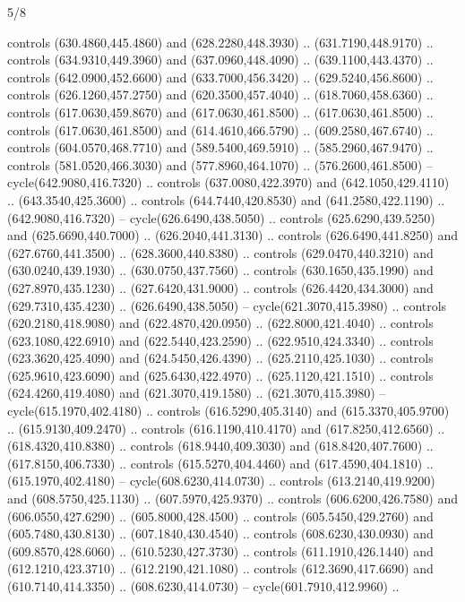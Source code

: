\begin{flagdescription}{5/8}
\begin{scope}[shift={(m)}]
\begin{scope}[scale=\flagwidth/220,y=0.1mm, x=0.1mm, yscale=-1,shift={(-596,-360)}]
\begin{scope}[line width=0.381\lw]
\begin{scope}[draw=black]
  controls (630.4860,445.4860) and (628.2280,448.3930) .. (631.7190,448.9170) ..
  controls (634.9310,449.3960) and (637.0960,448.4090) .. (639.1100,443.4370) ..
  controls (642.0900,452.6600) and (633.7000,456.3420) .. (629.5240,456.8600) ..
  controls (626.1260,457.2750) and (620.3500,457.4040) .. (618.7060,458.6360) ..
  controls (617.0630,459.8670) and (617.0630,461.8500) .. (617.0630,461.8500) ..
  controls (617.0630,461.8500) and (614.4610,466.5790) .. (609.2580,467.6740) ..
  controls (604.0570,468.7710) and (589.5400,469.5910) .. (585.2960,467.9470) ..
  controls (581.0520,466.3030) and (577.8960,464.1070) .. (576.2600,461.8500) --
  cycle(642.9080,416.7320) .. controls (637.0080,422.3970) and
  (642.1050,429.4110) .. (643.3540,425.3600) .. controls (644.7440,420.8530) and
  (641.2580,422.1190) .. (642.9080,416.7320) -- cycle(626.6490,438.5050) ..
  controls (625.6290,439.5250) and (625.6690,440.7000) .. (626.2040,441.3130) ..
  controls (626.6490,441.8250) and (627.6760,441.3500) .. (628.3600,440.8380) ..
  controls (629.0470,440.3210) and (630.0240,439.1930) .. (630.0750,437.7560) ..
  controls (630.1650,435.1990) and (627.8970,435.1230) .. (627.6420,431.9000) ..
  controls (626.4420,434.3000) and (629.7310,435.4230) .. (626.6490,438.5050) --
  cycle(621.3070,415.3980) .. controls (620.2180,418.9080) and
  (622.4870,420.0950) .. (622.8000,421.4040) .. controls (623.1080,422.6910) and
  (622.5440,423.2590) .. (622.9510,424.3340) .. controls (623.3620,425.4090) and
  (624.5450,426.4390) .. (625.2110,425.1030) .. controls (625.9610,423.6090) and
  (625.6430,422.4970) .. (625.1120,421.1510) .. controls (624.4260,419.4080) and
  (621.3070,419.1580) .. (621.3070,415.3980) -- cycle(615.1970,402.4180) ..
  controls (616.5290,405.3140) and (615.3370,405.9700) .. (615.9130,409.2470) ..
  controls (616.1190,410.4170) and (617.8250,412.6560) .. (618.4320,410.8380) ..
  controls (618.9440,409.3030) and (618.8420,407.7600) .. (617.8150,406.7330) ..
  controls (615.5270,404.4460) and (617.4590,404.1810) .. (615.1970,402.4180) --
  cycle(608.6230,414.0730) .. controls (613.2140,419.9200) and
  (608.5750,425.1130) .. (607.5970,425.9370) .. controls (606.6200,426.7580) and
  (606.0550,427.6290) .. (605.8000,428.4500) .. controls (605.5450,429.2760) and
  (605.7480,430.8130) .. (607.1840,430.4540) .. controls (608.6230,430.0930) and
  (609.8570,428.6060) .. (610.5230,427.3730) .. controls (611.1910,426.1440) and
  (612.1210,423.3710) .. (612.2190,421.1080) .. controls (612.3690,417.6690) and
  (610.7140,414.3350) .. (608.6230,414.0730) -- cycle(601.7910,412.9960) ..

\end{scope}
\end{scope}
\end{scope}
\end{scope}
\end{flagdescription}
